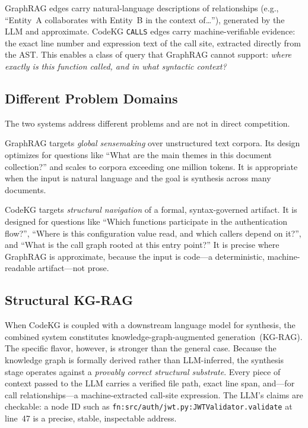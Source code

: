 \documentclass[10pt]{article}
\begin{document}
GraphRAG edges carry natural-language descriptions of relationships (e.g.,
``Entity~A collaborates with Entity~B in the context of\ldots''), generated by the
LLM and approximate. CodeKG \texttt{CALLS} edges carry machine-verifiable evidence:
the exact line number and expression text of the call site, extracted directly from
the AST. This enables a class of query that GraphRAG cannot support: \emph{where
exactly is this function called, and in what syntactic context?}

\subsection{Different Problem Domains}

The two systems address different problems and are not in direct competition.

GraphRAG targets \emph{global sensemaking} over unstructured text corpora. Its
design optimizes for questions like ``What are the main themes in this document
collection?'' and scales to corpora exceeding one million tokens. It is appropriate
when the input is natural language and the goal is synthesis across many documents.

CodeKG targets \emph{structural navigation} of a formal, syntax-governed artifact.
It is designed for questions like ``Which functions participate in the authentication
flow?'', ``Where is this configuration value read, and which callers depend on it?'',
and ``What is the call graph rooted at this entry point?'' It is precise where
GraphRAG is approximate, because the input is code---a deterministic, machine-readable
artifact---not prose.

\subsection{Structural KG-RAG}

When CodeKG is coupled with a downstream language model for synthesis, the combined
system constitutes knowledge-graph-augmented generation~(KG-RAG). The specific
flavor, however, is stronger than the general case. Because the knowledge graph is
formally derived rather than LLM-inferred, the synthesis stage operates against a
\emph{provably correct structural substrate}. Every piece of context passed to the
LLM carries a verified file path, exact line span, and---for call relationships---a
machine-extracted call-site expression. The LLM's claims are checkable: a node ID
such as \texttt{fn:src/auth/jwt.py:JWTValidator.validate} at line~47 is a precise,
stable, inspectable address.
\end{document}
